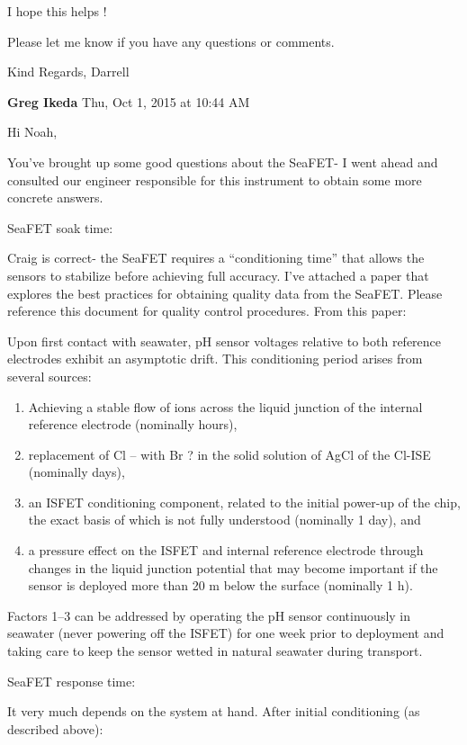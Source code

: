 \documentclass[]{book}
\begin{document}
I hope this helps !

Please let me know if you have any questions or comments.

Kind Regards,
Darrell

\textbf{Greg Ikeda} Thu, Oct 1, 2015 at 10:44 AM

Hi Noah,

You've brought up some good questions about the SeaFET- I went ahead and consulted our engineer responsible for this instrument to obtain some more concrete answers.

SeaFET soak time:

Craig is correct- the SeaFET requires a ``conditioning time'' that allows the sensors to stabilize before achieving full accuracy. I've attached a paper that explores the best practices for obtaining quality data from the SeaFET. Please reference this document for quality control procedures. From this paper:

Upon first contact with seawater, pH sensor voltages relative to both reference electrodes exhibit an asymptotic
drift. This conditioning period arises from several sources:

\begin{enumerate}
\def\labelenumi{\arabic{enumi})}
\item
  Achieving a stable flow of ions across the liquid junction of the internal reference electrode (nominally hours),
\item
  replacement of Cl -- with Br ? in the solid solution of AgCl of the Cl-ISE (nominally days),
\item
  an ISFET conditioning component, related to the initial power-up of the chip, the exact basis of which is not fully understood (nominally 1 day), and
\item
  a pressure effect on the ISFET and internal reference electrode through changes in the liquid junction potential that may become important if the sensor is deployed more than 20 m below the surface (nominally 1 h).
\end{enumerate}

Factors 1--3 can be addressed by operating the pH sensor continuously in seawater (never powering off the ISFET) for one week prior to deployment and taking care to keep the sensor wetted in natural seawater during transport.

SeaFET response time:

It very much depends on the system at hand. After initial conditioning (as described above):
\end{document}
